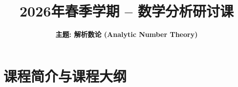 \everymath{\displaystyle}



\title[数学分析研讨课]{\texorpdfstring{\Huge \bfseries 2026年春季学期 -- 数学分析研讨课}{2026年春季学期 -- 数学分析研讨课}} %
\author[解析数论] %
{\huge \bfseries 主题: 解析数论 (Analytic Number Theory)}
\date{}





\begin{frame}

\titlepage %

\end{frame}




\section{课程简介与课程大纲}

